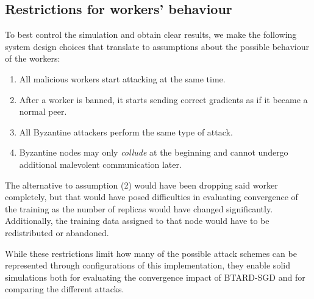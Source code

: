 \documentclass{article}
\begin{document}
\subsection{Restrictions for workers' behaviour}
To best control the simulation and obtain clear results, we make the following system design choices that translate to assumptions about the possible behaviour of the workers:
\begin{enumerate}
    \item All malicious workers start attacking at the same time. 
    \item After a worker is banned, it starts sending correct gradients as if it became a normal peer.
    \item All Byzantine attackers perform the same type of attack.
    \item Byzantine nodes may only \textit{collude} at the beginning and cannot undergo additional malevolent communication later.
\end{enumerate}

The alternative to assumption (2) would have been dropping said worker completely, but that would have posed difficulties in evaluating convergence of the training as the number of replicas would have changed significantly. Additionally, the training data assigned to that node would have to be redistributed or abandoned.

While these restrictions limit how many of the possible attack schemes can be represented through configurations of this implementation, they enable solid simulations both for evaluating the convergence impact of BTARD-SGD and for comparing the different attacks.
\end{document}
